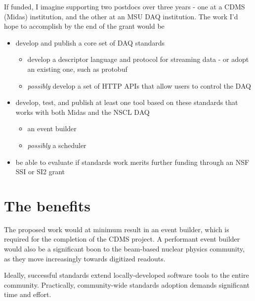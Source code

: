 \documentclass[]{report}   %
\begin{document}
If funded, I imagine supporting two postdocs over three years - one at a CDMS (Midas) institution, and the other at an MSU DAQ institution.  The work I'd hope to accomplish by the end of the grant would be
\begin{itemize}
 \item develop and publish a core set of DAQ standards
 \begin{itemize}
   \item develop a descriptor language and protocol for streaming data - or adopt an existing one, such as protobuf
   \item \emph{possibly} develop a set of HTTP APIs that allow users to control the DAQ
 \end{itemize}

 \item develop, test, and publish at least one tool based on these standards that works with both Midas and the NSCL DAQ 
 \begin{itemize}
   \item an event builder
   \item \emph{possibly} a scheduler
 \end{itemize}

 \item be able to evaluate if standards work merits further funding through an NSF SSI or SI2 grant
\end{itemize}


\section*{The benefits}
The proposed work would at minimum result in an event builder, which is required for the completion of the CDMS project.  A performant event builder would also be a significant boon to the beam-based nuclear physics community, as they move increasingly towards digitized readouts.  


Ideally, successful standards extend locally-developed software tools to the entire community. Practically, community-wide standards adoption demands significant time and effort. 
\end{document}
